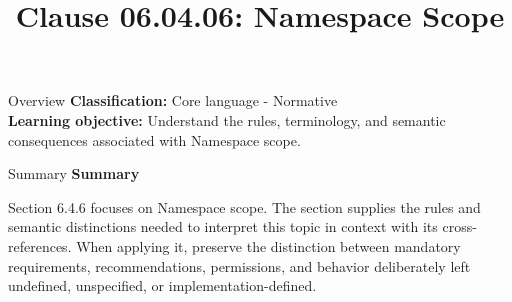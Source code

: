 \documentclass[10pt,letterpaper]{article}
\title{Clause 06.04.06: Namespace Scope}
\author{}
\date{}
\begin{document}
\maketitle
\begin{CornellOverviewBox}{Overview}
\textbf{Classification:} Core language - Normative\\[2pt]
\textbf{Learning objective:} Understand the rules, terminology, and semantic consequences associated with Namespace scope.
\end{CornellOverviewBox}\begin{CornellSummaryBox}{Summary}
{\sffamily\bfseries\color{Accent} Summary}\par\vspace{3pt}Section 6.4.6 focuses on Namespace scope. The section supplies the rules and semantic distinctions needed to interpret this topic in context with its cross-references. When applying it, preserve the distinction between mandatory requirements, recommendations, permissions, and behavior deliberately left undefined, unspecified, or implementation-defined.
\end{CornellSummaryBox}
\end{document}
